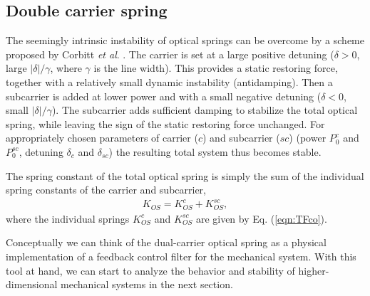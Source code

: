 \subsection{Double carrier spring}

The seemingly intrinsic instability of optical springs can be overcome by a scheme 
proposed by Corbitt \emph{et al}. \cite{Corbitt07}. The carrier is set at a large positive detuning ($\delta>0$, large $|\delta|/\gamma$, where $\gamma$ is the line width). This provides a static restoring force, together with a relatively small dynamic instability (antidamping). Then a subcarrier is added at lower power and with a small negative detuning ($\delta<0$, small $|\delta|/\gamma$). The subcarrier adds sufficient damping to stabilize the total optical spring, while leaving the sign of the static restoring force unchanged.
For appropriately chosen parameters of carrier ($c$) and subcarrier ($sc$) (power $P_0^c$ and $P_0^{sc}$, detuning  $\delta_c$ and $\delta_{sc}$) the resulting total system thus becomes stable.

The spring constant of the total optical spring is simply the sum of the individual spring constants of the carrier and subcarrier,
\begin{align}
\label{eqn:KOSsum}
K_{OS}=K_{OS}^c+K_{OS}^{sc},
\end{align}
where the individual springs $K_{OS}^c$ and $K_{OS}^{sc}$ are given by Eq. (\ref{eqn:TFco}).


Conceptually we can think of the dual-carrier optical spring as a physical implementation of a feedback control filter for the mechanical system. With this tool at hand, we can start to analyze the behavior and stability of higher-dimensional mechanical systems in the next section.



